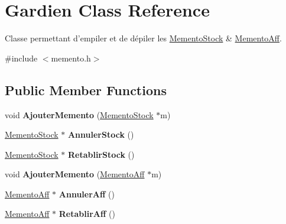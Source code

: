 \hypertarget{class_gardien}{\section{Gardien Class Reference}
\label{class_gardien}
}


Classe permettant d'empiler et de dépiler les \hyperlink{class_memento_stock}{Memento\-Stock} \& \hyperlink{class_memento_aff}{Memento\-Aff}.  




{\ttfamily \#include $<$memento.\-h$>$}

\subsection*{Public Member Functions}
\begin{DoxyCompactItemize}
\item 
\hypertarget{class_gardien_a25ff2936955eb98a8eef1fbe4dc0b9d0}{void {\bfseries Ajouter\-Memento} (\hyperlink{class_memento_stock}{Memento\-Stock} $\ast$m)}\label{class_gardien_a25ff2936955eb98a8eef1fbe4dc0b9d0}

\item 
\hypertarget{class_gardien_a01fe8e7e99114ecc5979a9109001c24d}{\hyperlink{class_memento_stock}{Memento\-Stock} $\ast$ {\bfseries Annuler\-Stock} ()}\label{class_gardien_a01fe8e7e99114ecc5979a9109001c24d}

\item 
\hypertarget{class_gardien_a106f068a93a38b146201d6dc8d9b06e6}{\hyperlink{class_memento_stock}{Memento\-Stock} $\ast$ {\bfseries Retablir\-Stock} ()}\label{class_gardien_a106f068a93a38b146201d6dc8d9b06e6}

\item 
\hypertarget{class_gardien_ab24502a38d3078c3c24510e13a6486ee}{void {\bfseries Ajouter\-Memento} (\hyperlink{class_memento_aff}{Memento\-Aff} $\ast$m)}\label{class_gardien_ab24502a38d3078c3c24510e13a6486ee}

\item 
\hypertarget{class_gardien_ad607200bff6e2b690ab5b065c77cbd7b}{\hyperlink{class_memento_aff}{Memento\-Aff} $\ast$ {\bfseries Annuler\-Aff} ()}\label{class_gardien_ad607200bff6e2b690ab5b065c77cbd7b}

\item 
\hypertarget{class_gardien_af2bee95e5eee42060dd738ad73187b5c}{\hyperlink{class_memento_aff}{Memento\-Aff} $\ast$ {\bfseries Retablir\-Aff} ()}\label{class_gardien_af2bee95e5eee42060dd738ad73187b5c}

\end{DoxyCompactItemize}
